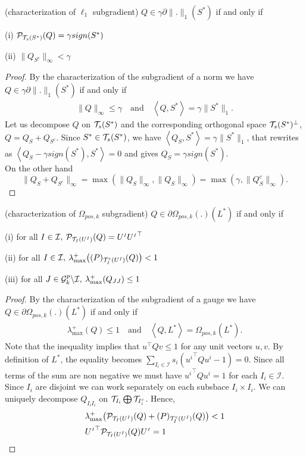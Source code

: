 \documentclass[letterpaper]{article}
\begin{document}
\begin{lemma}(characterization of $\ell_1$ subgradient) $Q\in \gamma \partial \|.\|_1(S^*)$ if and only if
\item[(i)] $\mathcal{P}_{\mathcal{T}_s(S^*)}(Q)=\gamma sign(S^*)$
\item[(ii)] $\|Q_{S^c}\|_{\infty}<\gamma$
\end{lemma}
\begin{proof}
By the characterization of the subgradient of a norm we have $Q\in \gamma \partial \|.\|_1(S^*)$ if and only if
\begin{align}
\|Q\|_{\infty}\leq \gamma \quad \text{and} \quad \left\langle Q,S^*\right\rangle=\gamma\|S^*\|_1. \label{eq:subgl1}
\end{align}
Let us decompose $Q$ on $\mathcal{T}_s(S^*)$ and the corresponding orthogonal space $\mathcal{T}_s(S^*)^{\perp}$, $Q= Q_S+Q_{S^c}$. Since $S^*\in\mathcal{T}_s(S^*)$, we have $\left\langle Q_S,S^*\right\rangle=\gamma\|S^*\|_1$, that rewrites as  $\left\langle Q_S-\gamma sign(S^*),S^*\right\rangle=0$ and gives $Q_S=\gamma sign(S^*)$.\\
On the other hand 
$$\|Q_S+Q_{S^c}\|_{\infty}=\max\left(\|Q_S\|_{\infty},\|Q_S\|_{\infty}\right)=\max\left(\gamma,\|Q_S^c\|_{\infty}\right).$$
\end{proof}
\begin{lemma}(characterization of $\Omega_{pos,k}$ subgradient) $Q\in \partial \Omega_{pos,k}(.)(L^*)$ if and only if
\item[(i)] for all $I \in \mathcal{I},\:\mathcal{P}_{\mathcal{T}_I(U^{{\scriptscriptstyle I}})}(Q)=U^{{\scriptscriptstyle I}}{U^{{\scriptscriptstyle I}}}^\top$
\item[(ii)] for all $I \in \mathcal{I},\:\lambda_{\max}^+\big (\mathcal(P)_{\mathcal{T}_I^c(U^{{\scriptscriptstyle I}})}(Q) \big )<1$
\item[(iii)] for all $J \in \mathcal{G}^p_k \backslash \mathcal{I}, \: \lambda_{\max}^+(Q_{JJ})\leq 1$
\end{lemma}
\begin{proof}
By the characterization of the subgradient of a gauge we have  $Q\in \partial \Omega_{pos,k}(.)(L^*)$ if and only if
\begin{align}
\lambda_{\max}^+(Q)\leq 1\quad \text{and} \quad \left\langle Q,L^*\right\rangle=\Omega_{pos,k}(L^*). \label{eq:subgom}
\end{align}
Note that the inequality implies that $u^{\top}Qv\leq1$ for any unit vectors $u,v$. By definition of $L^*$, the equality becomes $\sum_{I_i\in\mathcal{I}}s_i \left({u^i}^{\top}Qu^i-1\right)=0$. Since all terms of the sum are non negative we must have ${u^i}^{\top}Qu^i=1$ for each $I_i\in\mathcal{I}$. Since $I_i$ are disjoint we can work separately on each subsbace $I_i\times I_i$. We can uniquely decompose $Q_{I_iI_i}$ on $\mathcal{T}_{I_i}\bigoplus \mathcal{T}_{I_i^c}$. Hence, 
\begin{align}
&\lambda_{\max}^+\big (\mathcal{P}_{\mathcal{T}_I(U^{{\scriptscriptstyle I}})}(Q) + \mathcal(P)_{\mathcal{T}_I^c(U^{{\scriptscriptstyle I}})}(Q) \big )<1\\
&{U^{{\scriptscriptstyle I}}}^\top\mathcal{P}_{\mathcal{T}_I(U^{{\scriptscriptstyle I}})}(Q)U^{{\scriptscriptstyle I}}=1
\end{align}
\end{proof}
\end{document}
